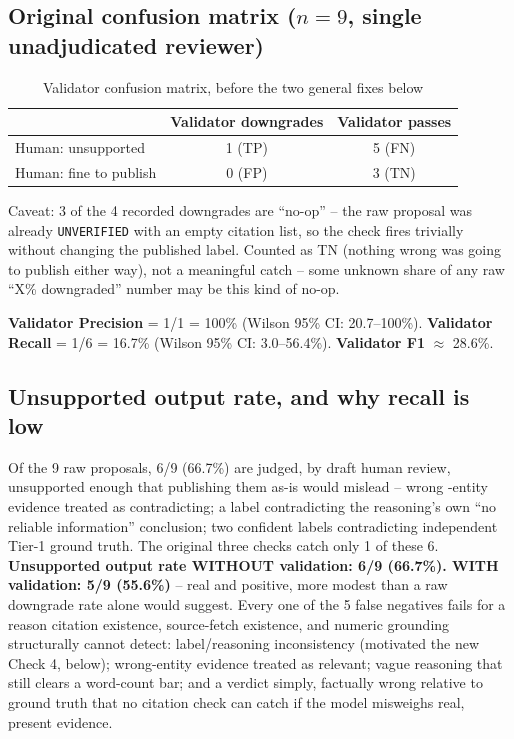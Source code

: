 \documentclass[conference]{IEEEtran}
\begin{document}
\subsection{Original confusion matrix ($n=9$, single unadjudicated reviewer)}
\begin{table}[!t]
\caption{Validator confusion matrix, before the two general fixes below}
\label{tab:validator-before}
\centering
\scriptsize
\begin{tabular}{lcc}
\toprule
 & Validator downgrades & Validator passes \\
\midrule
Human: unsupported & 1 (TP) & 5 (FN) \\
Human: fine to publish & 0 (FP) & 3 (TN) \\
\bottomrule
\end{tabular}
\end{table}

Caveat: 3 of the 4 recorded downgrades are ``no-op'' -- the raw proposal
was already \texttt{UNVERIFIED} with an empty citation list, so the
check fires trivially without changing the published label. Counted as
TN (nothing wrong was going to publish either way), not a meaningful
catch -- some unknown share of any raw ``X\% downgraded'' number may be
this kind of no-op.

\textbf{Validator Precision} = 1/1 = 100\% (Wilson 95\% CI: 20.7--100\%).
\textbf{Validator Recall} = 1/6 = 16.7\% (Wilson 95\% CI: 3.0--56.4\%).
\textbf{Validator F1} $\approx$ 28.6\%.

\subsection{Unsupported output rate, and why recall is low}
Of the 9 raw proposals, 6/9 (66.7\%) are judged, by draft human review,
unsupported enough that publishing them as-is would mislead -- wrong
-entity evidence treated as contradicting; a label contradicting the
reasoning's own ``no reliable information'' conclusion; two confident
labels contradicting independent Tier-1 ground truth. The original three
checks catch only 1 of these 6. \textbf{Unsupported output rate WITHOUT
validation: 6/9 (66.7\%). WITH validation: 5/9 (55.6\%)} -- real and
positive, more modest than a raw downgrade rate alone would suggest.
Every one of the 5 false negatives fails for a reason citation existence,
source-fetch existence, and numeric grounding structurally cannot detect:
label/reasoning inconsistency (motivated the new Check 4, below);
wrong-entity evidence treated as relevant; vague reasoning that still
clears a word-count bar; and a verdict simply, factually wrong relative
to ground truth that no citation check can catch if the model misweighs
real, present evidence.
\end{document}
